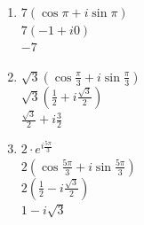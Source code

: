 \documentclass[11pt, a4paper]{article}
\begin{document}
\begin{enumerate}
	\item $7 \left( \cos \pi + i \sin \pi \right)$ \\
	$7 \left( -1 + i 0 \right)$ \\
	$-7$
	\item $\sqrt{3} \left( \cos \frac{\pi}{3} + i \sin \frac{\pi}{3} \right)$ \\
	$\sqrt{3} \left( \frac{1}{2} + i \frac{\sqrt{3}}{2} \right)$ \\
	$\frac{\sqrt{3}}{2} + i \frac{3}{2}$
	\item $2 \cdot e^{i \frac{5 \pi}{3}}$ \\
	$2 \left( \cos \frac{5\pi}{3} + i \sin \frac{5\pi}{3} \right) $ \\
	$2 \left( \frac{1}{2} - i \frac{\sqrt{3}}{2} \right)$ \\
	$1 - i \sqrt{3}$
\end{enumerate}
\end{document}
